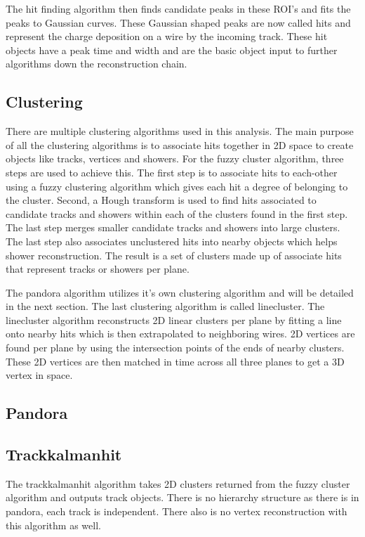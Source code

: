 The hit finding algorithm then finds candidate peaks in these ROI's and fits the peaks to Gaussian curves. These Gaussian shaped peaks are now called hits and represent the charge deposition on a wire by the incoming track. These hit objects have a peak time and width and are the basic object input to further algorithms down the reconstruction chain.   
\subsection{Clustering}
There are multiple clustering algorithms used in this analysis. The main purpose of all the clustering algorithms is to associate hits together in 2D space to create objects like tracks, vertices and showers. For the fuzzy cluster algorithm, three steps are used to achieve this. The first step is to associate hits to each-other using a fuzzy clustering algorithm which gives each hit a degree of belonging to the cluster. Second, a Hough transform is used to find hits associated to candidate tracks and showers within each of the clusters found in the first step. The last step merges smaller candidate tracks and showers into large clusters. The last step also associates unclustered hits into nearby objects which helps shower reconstruction. The result is a set of clusters made up of associate hits that represent tracks or showers per plane. 

The pandora algorithm utilizes it's own clustering algorithm and will be detailed in the next section. The last clustering algorithm is called linecluster. The linecluster algorithm reconstructs 2D linear clusters per plane by fitting a line onto nearby hits which is then extrapolated to neighboring wires. 2D vertices are found per plane by using the intersection points of the ends of nearby clusters. These 2D vertices are then matched in time across all three planes to get a 3D vertex in space.  
\subsection{Pandora}

\subsection{Trackkalmanhit}
The trackkalmanhit algorithm takes 2D clusters returned from the fuzzy cluster algorithm and outputs track objects. There is no hierarchy structure as there is in pandora, each track is independent. There also is no vertex reconstruction with this algorithm as well.
